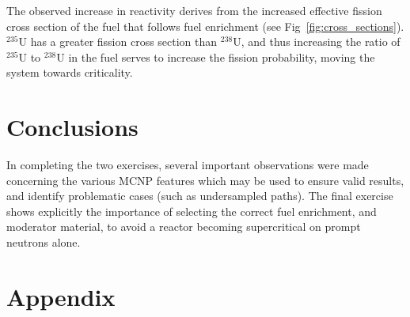 \documentclass{article}
\begin{document}
    The observed increase in reactivity derives from the increased effective fission cross section of the fuel that follows fuel enrichment (see Fig~\ref{fig:cross_sections}). $^{235}\text{U}$ has a greater fission cross section than $^{238}\text{U}$, and thus increasing the ratio of $^{235}\text{U}$ to $^{238}\text{U}$ in the fuel serves to increase the fission probability, moving the system towards criticality.

\section{Conclusions}
  In completing the two exercises, several important observations were made concerning the various MCNP features which may be used to ensure valid results, and identify problematic cases (such as undersampled paths). The final exercise shows explicitly the importance of selecting the correct fuel enrichment, and moderator material, to avoid a reactor becoming supercritical on prompt neutrons alone.


\section{Appendix}
    \inputminted[linenos,breaklines]{lexer.py -x}{mcnp/1.ip}

    \inputminted[linenos,breaklines]{lexer.py -x}{mcnp/3.d.2.ip}
    
\printbibliography
\end{document}
